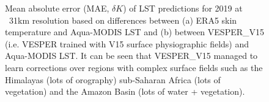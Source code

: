 \documentclass[hess, twostagejnl]{copernicus}
\begin{document}
 
 
 \begin{figure}
 	 \hspace{1mm}
 	\caption{Mean absolute error (MAE, $\delta K$) of LST predictions for 2019 at ~31km resolution based on differences between (a) ERA5 skin temperature and Aqua-MODIS LST and  (b) between VESPER\_V15 (i.e. VESPER trained with V15 surface physiographic fields) and Aqua-MODIS LST. It can be seen that VESPER\_V15 managed to learn corrections over regions with complex surface fields such as the Himalayas (lots of orography) sub-Saharan Africa (lots of vegetation) and the Amazon Basin (lots of water + vegetation). } 
 	\label{fig:example_model}
 \end{figure}
\end{document}
